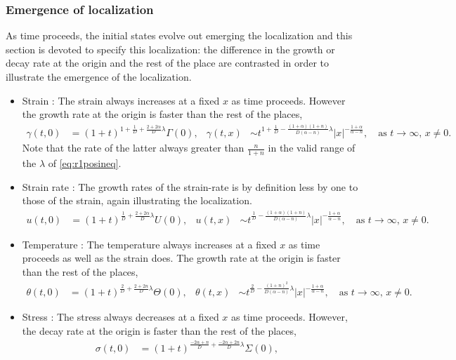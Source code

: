 \documentclass[a4paper,11pt]{article}
\begin{document}
\subsubsection{Emergence of localization}
As time proceeds, the initial states evolve out emerging the localization and this section is devoted to specify this localization: the difference in the growth or decay rate at the origin and the rest of the place are contrasted in order to illustrate the emergence of the localization. 
\begin{itemize}
 \item Strain : The strain always increases at a fixed $x$ as time proceeds. However the growth rate at the origin is faster than the rest of the places,
\begin{align*}
 \gamma(t,0) &= (1+t)^{1+\frac{1}{D} + \frac{2+2\alpha}{D}\lambda}\Gamma(0), &
 \gamma(t,x) &\sim t^{1+\frac{1}{D} - \frac{(1+\alpha)(1+n)}{D(\alpha-n)}\lambda}|x|^{-\frac{1+\alpha}{\alpha-n}}, \quad \text{as $t \rightarrow \infty$, $x\ne0$.}
\end{align*}
Note that the rate of the latter always greater than $\frac{n}{1+n}$ in the valid range of the $\lambda$ of \eqref{eq:r1posineq}.
\item Strain rate : The growth rates of the strain-rate is by definition less by one to those of the strain, again illustrating the localization.
\begin{align*}
 u(t,0) &= (1+t)^{\frac{1}{D} + \frac{2+2\alpha}{D}\lambda}U(0),&
 u(t,x) &\sim t^{\frac{1}{D} - \frac{(1+\alpha)(1+n)}{D(\alpha-n)}\lambda}|x|^{-\frac{1+\alpha}{\alpha-n}}, \quad \text{as $t \rightarrow \infty$, $x\ne0$.}
\end{align*}
\item Temperature : The temperature always increases at a fixed $x$ as time proceeds as well as the strain does. The growth rate at the origin is faster than the rest of the places,
\begin{align*}
 \theta(t,0) &= (1+t)^{\frac{2}{D} + \frac{2+2n}{D}\lambda}\Theta(0),&
 \theta(t,x) &\sim t^{\frac{2}{D} - \frac{(1+n)^2}{D(\alpha-n)}\lambda}|x|^{-\frac{1+\alpha}{\alpha-n}}, \quad \text{as $t \rightarrow \infty$, $x\ne0$.}
\end{align*}
\item Stress : The stress always decreases at a fixed $x$ as time proceeds. However, the decay rate at the origin is faster than the rest of the places,
\begin{align*}
 \sigma(t,0) &= (1+t)^{\frac{-2\alpha+n}{D} + \frac{-2\alpha+2n}{D}\lambda}\Sigma(0), &

\end{align*}
\end{itemize}
\end{document}
